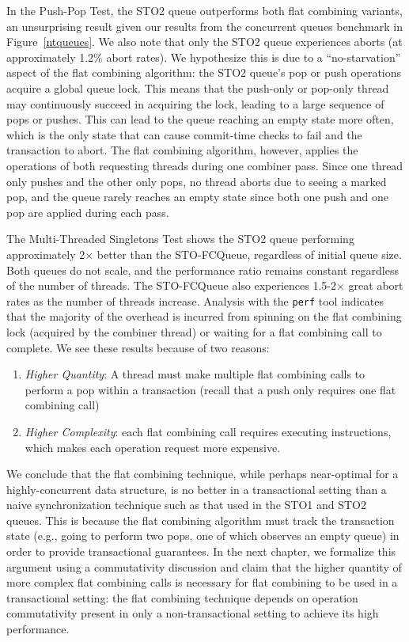 In the Push-Pop Test, the STO2 queue outperforms both flat combining variants, an unsurprising result given our results from the concurrent queues benchmark in Figure~\ref{ntqueues}. We also note that only the STO2 queue experiences aborts (at approximately 1.2\% abort rates). We hypothesize this is due to a ``no-starvation'' aspect of the flat combining algorithm: the STO2 queue's pop or push operations acquire a global queue lock. This means that the push-only or pop-only thread may continuously succeed in acquiring the lock, leading to a large sequence of pops or pushes. This can lead to the queue reaching an empty state more often, which is the only state that can cause commit-time checks to fail and the transaction to abort. The flat combining algorithm, however, applies the operations of both requesting threads during one combiner pass. Since one thread only pushes and the other only pops, no thread aborts due to seeing a marked pop, and the queue rarely reaches an empty state since both one push and one pop are applied during each pass.

The Multi-Threaded Singletons Test shows the STO2 queue performing approximately 2$\times$ better than the STO-FCQueue, regardless of initial queue size. Both queues do not scale, and the performance ratio remains constant regardless of the number of threads. The STO-FCQueue also experiences 1.5-2$\times$ great abort rates as the number of threads increase.
Analysis with the \texttt{perf} tool indicates that the majority of the overhead is incurred from spinning on the flat combining lock (acquired by the combiner thread) or waiting for a flat combining call to complete. We see these results because of two reasons:
\begin{enumerate}
\item \emph{Higher Quantity}: A thread must make multiple flat combining calls to perform a pop within a transaction (recall that a push only requires one flat combining call) 
\item \emph{Higher Complexity}: each flat combining call requires executing instructions, which makes each operation request more expensive.
\end{enumerate}

We conclude that the flat combining technique, while perhaps near-optimal for a highly-concurrent data structure, is no better in a transactional setting than a naive synchronization technique such as that used in the STO1 and STO2 queues. This is because the flat combining algorithm must track the transaction state (e.g., going to perform two pops, one of which observes an empty queue) in order to provide transactional guarantees. In the next chapter, we formalize this argument using a commutativity discussion and claim that the higher quantity of more complex flat combining calls is necessary for flat combining to be used in a transactional setting: the flat combining technique depends on operation commutativity present in only a non-transactional setting to achieve its high performance. 

